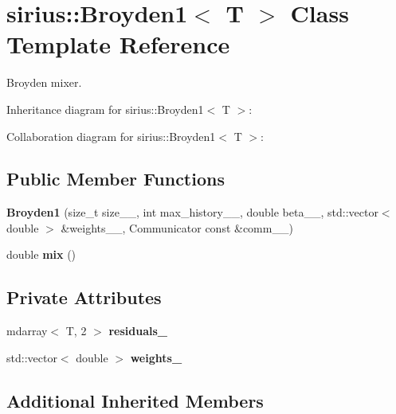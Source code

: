 \hypertarget{classsirius_1_1_broyden1}{}\section{sirius\+:\+:Broyden1$<$ T $>$ Class Template Reference}
\label{classsirius_1_1_broyden1}


Broyden mixer.  




Inheritance diagram for sirius\+:\+:Broyden1$<$ T $>$\+:


Collaboration diagram for sirius\+:\+:Broyden1$<$ T $>$\+:
\subsection*{Public Member Functions}
\begin{DoxyCompactItemize}
\item 
\hypertarget{classsirius_1_1_broyden1_aa8312446c5c7bd94796eaf3277eae32a}{}{\bfseries Broyden1} (size\+\_\+t size\+\_\+\+\_\+, int max\+\_\+history\+\_\+\+\_\+, double beta\+\_\+\+\_\+, std\+::vector$<$ double $>$ \&weights\+\_\+\+\_\+, Communicator const \&comm\+\_\+\+\_\+)\label{classsirius_1_1_broyden1_aa8312446c5c7bd94796eaf3277eae32a}

\item 
\hypertarget{classsirius_1_1_broyden1_afde91cdc610b09dd0af1bcade991b504}{}double {\bfseries mix} ()\label{classsirius_1_1_broyden1_afde91cdc610b09dd0af1bcade991b504}

\end{DoxyCompactItemize}
\subsection*{Private Attributes}
\begin{DoxyCompactItemize}
\item 
\hypertarget{classsirius_1_1_broyden1_a63d586eb641789ed990455fe8d34d429}{}mdarray$<$ T, 2 $>$ {\bfseries residuals\+\_\+}\label{classsirius_1_1_broyden1_a63d586eb641789ed990455fe8d34d429}

\item 
\hypertarget{classsirius_1_1_broyden1_a1200678b9ce7a55817655a18f73d81c1}{}std\+::vector$<$ double $>$ {\bfseries weights\+\_\+}\label{classsirius_1_1_broyden1_a1200678b9ce7a55817655a18f73d81c1}

\end{DoxyCompactItemize}
\subsection*{Additional Inherited Members}


